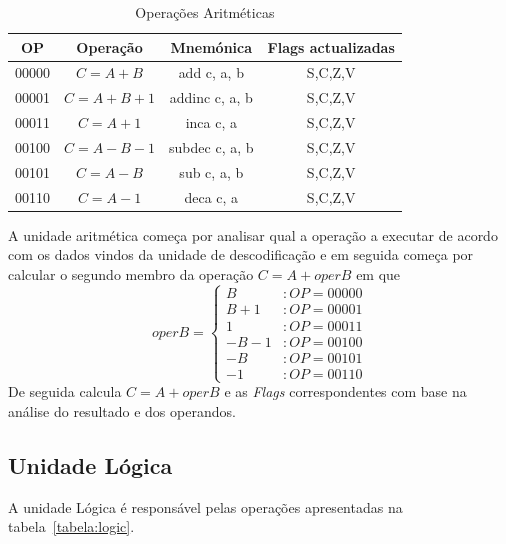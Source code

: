 \begin{table}[h]
	\centering
	\begin{tabular}{|c|c|c|c|}
		\hline
		OP    & Operação & Mnemónica & Flags actualizadas \\ \hline
		00000 & \mbox{$C=A+B$}    & add c, a, b    & S,C,Z,V   \\ \hline
		00001 & \mbox{$C=A+B+1$}  & addinc c, a, b & S,C,Z,V   \\ \hline
		00011 & \mbox{$C=A+1$}    & inca c, a      & S,C,Z,V   \\ \hline
		00100 & \mbox{$C=A-B-1$}  & subdec c, a, b & S,C,Z,V   \\ \hline
		00101 & \mbox{$C=A-B$}    & sub c, a, b    & S,C,Z,V   \\ \hline
		00110 & \mbox{$C=A-1$}    & deca c, a      & S,C,Z,V   \\ \hline
	\end{tabular}
	\caption{Operações Aritméticas}
	\label{tabela:arith}
\end{table}

A unidade aritmética começa por analisar qual a operação a executar de acordo com os dados vindos da unidade de descodificação e em seguida começa por calcular o segundo membro da operação \mbox{$C=A+operB$} em que 
\[ operB=\left\{
\begin{array}{lr}
B & : OP=00000\\
B+1 & : OP=00001\\
1 & : OP=00011\\
-B-1 & : OP=00100\\
-B & : OP=00101\\
-1 & : OP=00110
\end{array}
\right.\]
De seguida calcula \mbox{$C=A+operB$} e as \textit{Flags} correspondentes com base na análise do resultado e dos operandos.

\subsection{Unidade Lógica}

A unidade Lógica é responsável pelas operações apresentadas na tabela~\ref{tabela:logic}.\\

